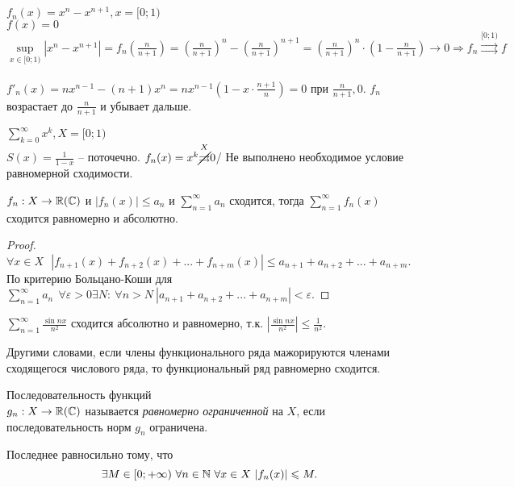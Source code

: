 \begin{Example}
	$f_n(x) = x^n - x^{n+1}, x = [0;1)$\\
	$f(x) = 0$\\
	$\underset{x \in [0;1)}{\sup} |x^n - x^{n+1}| = f_n (\frac{n}{n+1}) = 
	\left(\frac{n}{n+1}\right)^n - \left(\frac{n}{n+1}\right)^{n+1} = 
	\left(\frac{n}{n+1}\right)^n \cdot (1 - \frac{n}{n+1}) \to 0 \Rightarrow f_n \overset{[0;1)}{\rightrightarrows} f$\\ \\
	$f'_n(x) = nx^{n-1} - (n+1) x^n = nx^{n-1} (1 - x \cdot \frac{n+1}{n}) = 0$ при $\frac{n}{n+1}, 0$.
	$f_n$ возрастает до $\frac{n}{n+1}$ и убывает дальше. 
\end{Example}

\begin{Example}
	$\sum_{k=0}^{\infty} x^k, X = [0;1)$\\
	$S(x) = \frac{1}{1-x}$ -- поточечно. 
	$f_n(x) = x^k \overset{X}{\cancel{\rightrightarrows}} 0$/ Не выполнено необходимое условие равномерной 
	сходимости. 
\end{Example}

\begin{Thm}
	$f_n: X \to \mathbb{R} (\mathbb{C})$ и $|f_n(x)| \leqslant a_n$ и $\sum_{n=1}^{\infty} a_n$ сходится, тогда
	$\sum_{n=1}^{\infty} f_n(x)$ сходится равномерно и абсолютно. 
\end{Thm}

\begin{proof}
	$\forall x \in X \ \ \ |f_{n + 1}(x) + f_{n + 2}(x) + ... + f_{n + m}(x)| \leqslant a_{n + 1} + a_{n + 2} + ... + a_{n + m}$.\\
	По критерию Больцано-Коши для $\sum_{n = 1}^{\infty} a_n \ \ \forall \varepsilon > 0 \exists N: \ \forall n > N \ |a_{n + 1} + a_{n + 2} + ... + a_{n + m}| < \varepsilon$.
\end{proof}

\begin{Example}
	$\displaystyle \sum_{n = 1}^{\infty} \frac{\sin n x}{n^2}$ сходится абсолютно и равномерно, т.к. $\displaystyle \left| \frac{\sin n x}{n^2} \right| \leqslant \frac1{n^2}$.
\end{Example}

\begin{Rem}
	Другими словами, если члены функционального ряда мажорируются членами сходящегося числового ряда, то функциональный ряд равномерно сходится.
\end{Rem}

\begin{Def}
	Последовательность функций \\
	$g_n: X \to \mathbb{R}(\mathbb{C})$ называется \textit{равномерно ограниченной} на $X$, если последовательность норм $g_n$ ограничена.
	
	Последнее равносильно тому, что 
	$$\exists M \in [0; +\infty) \ \forall n \in \mathbb{N} \ \forall x \in X \ |f_n(x)| \leqslant M.$$
\end{Def}

